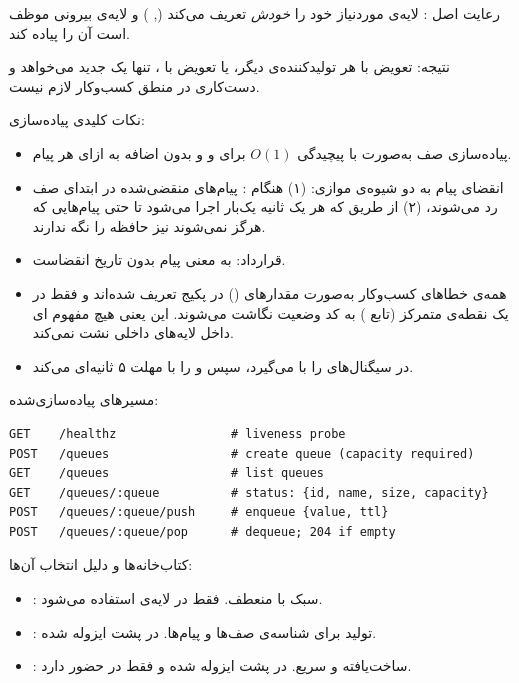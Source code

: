 {رعایت اصل :} لایه‌ی   موردنیاز خود را \emph{خودش} تعریف می‌کند (, ) و لایه‌ی بیرونی موظف است آن را پیاده کند. 

نتیجه: تعویض  با هر تولیدکننده‌ی  دیگر، یا تعویض  با ، تنها یک  جدید می‌خواهد و دست‌کاری در منطق کسب‌وکار لازم نیست.


{نکات کلیدی پیاده‌سازی:}
\begin{itemize}
    \item پیاده‌سازی صف به‌صورت  با پیچیدگی $O(1)$ برای  و  و بدون  اضافه به ازای هر پیام.
    \item انقضای پیام به دو شیوه‌ی موازی: (۱)  هنگام : پیام‌های منقضی‌شده در ابتدای صف رد می‌شوند، (۲)  از طریق  که هر یک ثانیه یک‌بار اجرا می‌شود تا حتی پیام‌هایی که هرگز  نمی‌شوند نیز حافظه را نگه ندارند.
    \item قرارداد:  به معنی پیام بدون تاریخ انقضاست.
    \item همه‌ی خطاهای کسب‌وکار به‌صورت مقدارهای  () در پکیج  تعریف شده‌اند و فقط در یک نقطه‌ی متمرکز (تابع ) به کد وضعیت  نگاشت می‌شوند. این یعنی هیچ مفهوم ای داخل لایه‌های داخلی نشت نمی‌کند.
    \item {} در  سیگنال‌های  را با  می‌گیرد، سپس  و  را با مهلت ۵ ثانیه‌ای  می‌کند.
\end{itemize}

{مسیرهای  پیاده‌سازی‌شده:}

\begin{latin}
\begin{verbatim}
GET    /healthz                # liveness probe
POST   /queues                 # create queue (capacity required)
GET    /queues                 # list queues
GET    /queues/:queue          # status: {id, name, size, capacity}
POST   /queues/:queue/push     # enqueue {value, ttl}
POST   /queues/:queue/pop      # dequeue; 204 if empty
\end{verbatim}
\end{latin}

{کتاب‌خانه‌ها و دلیل انتخاب آن‌ها:}
\begin{itemize}
    \item {}:  سبک با  منعطف. فقط در لایه‌ی  استفاده می‌شود.
    \item {}: تولید  برای شناسه‌ی صف‌ها و پیام‌ها. در پشت   ایزوله شده.
    \item {}:  ساخت‌یافته و سریع. در پشت   ایزوله شده و فقط در  حضور دارد.
\end{itemize}

